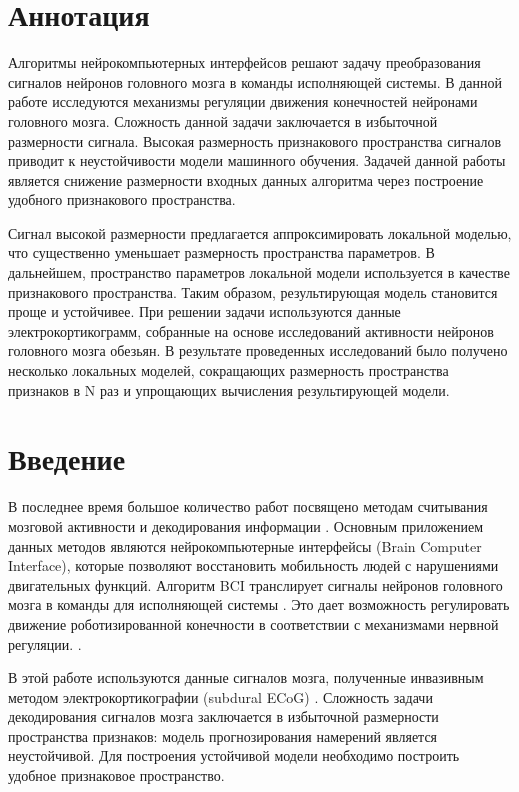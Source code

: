 \documentclass{mipt-thesis-bs}
\begin{document}
\setcounter{page}{2}
\chapter{Аннотация}
Алгоритмы нейрокомпьютерных интерфейсов решают задачу преобразования сигналов нейронов головного мозга в команды исполняющей системы. В данной работе исследуются механизмы регуляции движения конечностей нейронами головного мозга. Сложность данной задачи заключается в избыточной размерности сигнала. Высокая размерность признакового пространства сигналов приводит к неустойчивости модели машинного обучения. Задачей данной работы является снижение размерности входных данных алгоритма через построение удобного признакового пространства.

Сигнал высокой размерности предлагается аппроксимировать локальной моделью, что существенно уменьшает размерность пространства параметров. В дальнейшем, пространство параметров локальной модели используется в качестве признакового пространства. Таким образом, результирующая модель становится проще и устойчивее. При решении задачи используются данные электрокортикограмм, собранные на основе исследований активности нейронов головного мозга обезьян.
В результате проведенных исследований было получено несколько локальных моделей, сокращающих размерность пространства признаков в N раз и упрощающих вычисления результирующей модели.


\newpage
\tableofcontents{}


\chapter{Введение}
В последнее время большое количество работ посвящено методам считывания мозговой активности и декодирования информации \cite{Hu2018,Song2017,Loza2017,Eliseyev2016,Gaglianese2016,Bundy2016,Morishita2014}.
Основным приложением данных методов являются нейрокомпьютерные интерфейсы (Brain Computer Interface), которые позволяют восстановить мобильность людей с нарушениями двигательных функций.  Алгоритм BCI транслирует сигналы нейронов головного мозга в команды для исполняющей системы \cite{Morishita2014}. Это дает возможность регулировать движение роботизированной конечности в соответствии с механизмами нервной регуляции. \cite{Donoghue2008}. 

В этой работе используются данные сигналов мозга, полученные инвазивным методом электрокортикографии (subdural ECoG) \cite{Sirven2014}. Сложность задачи декодирования сигналов мозга заключается в избыточной размерности пространства признаков: модель прогнозирования намерений является неустойчивой. Для построения устойчивой модели необходимо построить удобное признаковое пространство.
\end{document}
